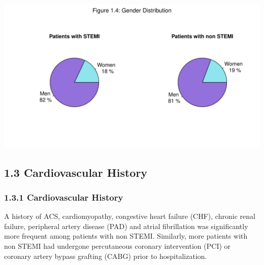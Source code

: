 \documentclass[
]{article}
\begin{document}
~

~

\includegraphics{‏‏ACSIS_2024_v1_pdf_without_files/figure-latex/unnamed-chunk-17-1.pdf}

\pagebreak

\subsection{1.3 Cardiovascular History}\label{cardiovascular-history}

\subsubsection{1.3.1 Cardiovascular
History}\label{cardiovascular-history-1}

A history of ACS, cardiomyopathy, congestive heart failure (CHF),
chronic renal failure, peripheral artery disease (PAD) and atrial
fibrillation was significantly more frequent among patients with non
STEMI. Similarly, more patients with non STEMI had undergone
percutaneous coronary intervention (PCI) or coronary artery bypass
grafting (CABG) prior to hospitalization.

~
\end{document}
